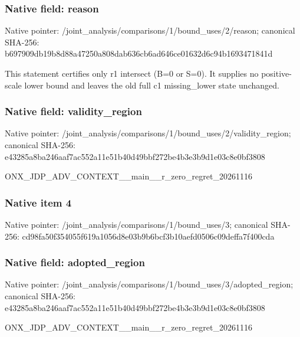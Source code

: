 \documentclass[10pt,a4paper]{article}
\begin{document}
\subsubsection{Native field: reason}
Native pointer: /joint\_\allowbreak{}analysis/comparisons/1/bound\_\allowbreak{}uses/2/reason; canonical SHA-256: b697909db19b8d88a47250a808dab636cb6ad646ce01632d6c94b1693471841d

\begingroup\raggedright\sloppy This statement certifies only r1 intersect (B=\allowbreak{}0 or S=\allowbreak{}0). It supplies no positive-scale lower bound and leaves the old full c1 missing\_\allowbreak{}lower state unchanged.\par\endgroup

\subsubsection{Native field: validity\_\allowbreak{}region}
Native pointer: /joint\_\allowbreak{}analysis/comparisons/1/bound\_\allowbreak{}uses/2/validity\_\allowbreak{}region; canonical SHA-256: e43285a8ba246aaf7ac552a11e51b40d49bbf272be4b3e3b9d1e03c8e0bf3808

\begingroup\raggedright\sloppy ONX\_\allowbreak{}JDP\_\allowbreak{}ADV\_\allowbreak{}CONTEXT\_\allowbreak{}\_\allowbreak{}main\_\allowbreak{}\_\allowbreak{}r\_\allowbreak{}zero\_\allowbreak{}regret\_\allowbreak{}20261116\par\endgroup

\subsubsection{Native item 4}
Native pointer: /joint\_\allowbreak{}analysis/comparisons/1/bound\_\allowbreak{}uses/3; canonical SHA-256: cd98fa50f354055f619a1056d8e03b9b6bcf3b10aefd0506c09deffa7f400cda

\subsubsection{Native field: adopted\_\allowbreak{}region}
Native pointer: /joint\_\allowbreak{}analysis/comparisons/1/bound\_\allowbreak{}uses/3/adopted\_\allowbreak{}region; canonical SHA-256: e43285a8ba246aaf7ac552a11e51b40d49bbf272be4b3e3b9d1e03c8e0bf3808

\begingroup\raggedright\sloppy ONX\_\allowbreak{}JDP\_\allowbreak{}ADV\_\allowbreak{}CONTEXT\_\allowbreak{}\_\allowbreak{}main\_\allowbreak{}\_\allowbreak{}r\_\allowbreak{}zero\_\allowbreak{}regret\_\allowbreak{}20261116\par\endgroup
\end{document}
